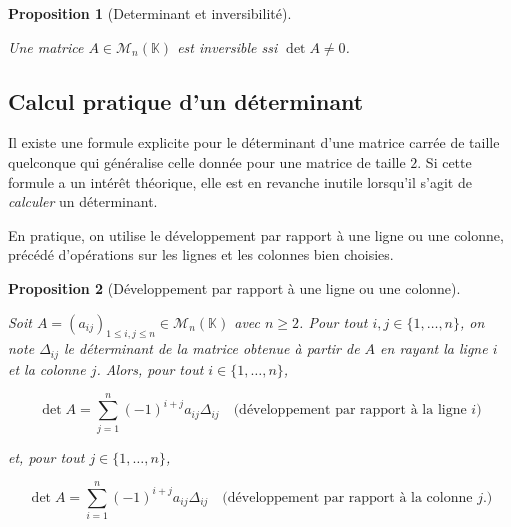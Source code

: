 \documentclass[
  french,
  letterpaper,
  DIV=11,
  numbers=noendperiod]{scrreprt}
\theoremstyle{plain}
\theoremstyle{definition}
\theoremstyle{plain}
\newtheorem{proposition}{Proposition}[chapter]
\theoremstyle{plain}
\theoremstyle{definition}
\theoremstyle{definition}
\theoremstyle{plain}
\theoremstyle{remark}
\begin{document}
\begin{proposition}[Determinant et
inversibilité]\protect\hypertarget{prp-inversibilite}{}\label{prp-inversibilite}

Une matrice \(A \in \mathcal{M}_{n}(\mathbb{K})\) est inversible ssi
\(\det A \neq
0\).

\end{proposition}

\subsection{Calcul pratique d'un
déterminant}\label{calcul-pratique-dun-duxe9terminant}

Il existe une formule explicite pour le déterminant d'une matrice carrée
de taille quelconque qui généralise celle donnée pour une matrice de
taille \(2\). Si cette formule a un intérêt théorique, elle est en
revanche inutile lorsqu'il s'agit de \emph{calculer} un déterminant.

En pratique, on utilise le développement par rapport à une ligne ou une
colonne, précédé d'opérations sur les lignes et les colonnes bien
choisies.

\begin{proposition}[Développement par rapport à une ligne ou une
colonne]\protect\hypertarget{prp-developpement}{}\label{prp-developpement}

Soit
\(A = (a_{ij})_{1\leqslant i,j\leqslant n}\in \mathcal{M}_{n}(\mathbb{K})\)
avec \(n\geqslant 2\). Pour tout \(i,j\in\{1,\dots,n\}\), on note
\(\Delta_{ij}\) le déterminant de la matrice obtenue à partir de \(A\)
en rayant la ligne \(i\) et la colonne \(j\). Alors, pour tout
\(i\in\{1,\dots,n\}\),

\[ 
\det A  = \sum_{j=1}^n(-1)^{i+j}a_{ij}\Delta_{ij} \quad \text{(développement
par rapport à la ligne $i$)} 
\]

et, pour tout \(j \in \{1,\dots,n\}\),

\[
   \det A = \sum_{i=1}^{n}(-1)^{i+j} a_{ij}\Delta_{ij} \quad \text{(développement
par rapport à la colonne $j$.)} 
\]

\end{proposition}
\end{document}
